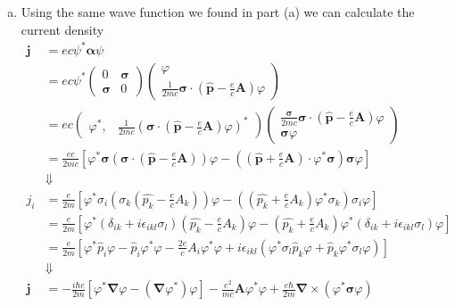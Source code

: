 \documentclass[11pt]{article}
\numberwithin{equation}{section}
\begin{document}
\begin{enumerate}[(a)]
\item Using the same wave function we found in part (a) we can calculate the current density
\begin{align*}
\mathbf{j} &= ec\psi^*\pmb{\alpha}\psi\\
&= ec\psi^*\left(\begin{array}{cc}
              0             &\pmb{\sigma}\\ 
              \pmb{\sigma}  &0
            \end{array}\right)
            \left(\begin{array}{cc}
              \varphi\\ 
              \frac{1}{2mc}\pmb{\sigma}\cdot\left(\hat{\mathbf{p}}-\frac{e}{c}\mathbf{A}\right)\varphi
            \end{array}\right)\\
&= ec       \left(\begin{array}{cc}
              \varphi^*,   &\frac{1}{2mc}\left(\pmb{\sigma}\cdot\left(\hat{\mathbf{p}}-\frac{e}{c}\mathbf{A}\right)\varphi\right)^*
            \end{array}\right)
            \left(\begin{array}{cc}
              \frac{\pmb{\sigma}}{2mc}\pmb{\sigma}\cdot\left(\hat{\mathbf{p}}-\frac{e}{c}\mathbf{A}\right)\varphi\\
              \pmb{\sigma}\varphi\
            \end{array}\right)\\
&= \frac{ec}{2mc}\left[\varphi^*\pmb{\sigma}\left(\pmb{\sigma}\cdot\left(\hat{\mathbf{p}}-\frac{e}{c}\mathbf{A}\right)\right)\varphi - \left(\left(\hat{\mathbf{p}}+\frac{e}{c}\mathbf{A}\right)\cdot\varphi^*\pmb{\sigma}\right)\pmb{\sigma}\varphi\right]\\
&\Downarrow\\
j_i &= \frac{e}{2m}\left[\varphi^*\sigma_i\left(\sigma_k\left(\hat{p_k}-\frac{e}{c}A_k\right)\right)\varphi - \left(\left(\hat{p_k}+\frac{e}{c}{A_k}\right)\varphi^*\sigma_k\right){\sigma_i}\varphi\right]\\
&= \frac{e}{2m}\left[\varphi^*(\delta_{ik}+i\epsilon_{ikl}\sigma_l)\left(\hat{p_k}-\frac{e}{c}A_k\right)\varphi - \left(\hat{p_k}+\frac{e}{c}{A_k}\right)\varphi^*(\delta_{ik}+i\epsilon_{ikl}\sigma_l)\varphi\right]\\
&= \frac{e}{2m}\left[\varphi^*\hat{p}_i\varphi - \hat{p}_i\varphi^*\varphi - \frac{2e}{c}A_i\varphi^*\varphi + i\epsilon_{ikl}\left(\varphi^*\sigma_l\hat{p}_k\varphi + \hat{p}_k\varphi^*\sigma_l\varphi\right)\right]\\
&\Downarrow\\
\mathbf{j} &= -\frac{i\hbar{e}}{2m}\left[\varphi^*\pmb{\nabla}\varphi - (\pmb{\nabla}\varphi^*)\varphi\right] - \frac{e^2}{mc}\mathbf{A}\varphi^*\varphi + \frac{e\hbar}{2m}\pmb{\nabla}\times(\varphi^*\pmb{\sigma}\varphi)
\end{align*}
\end{enumerate}
\pagebreak
\end{document}
